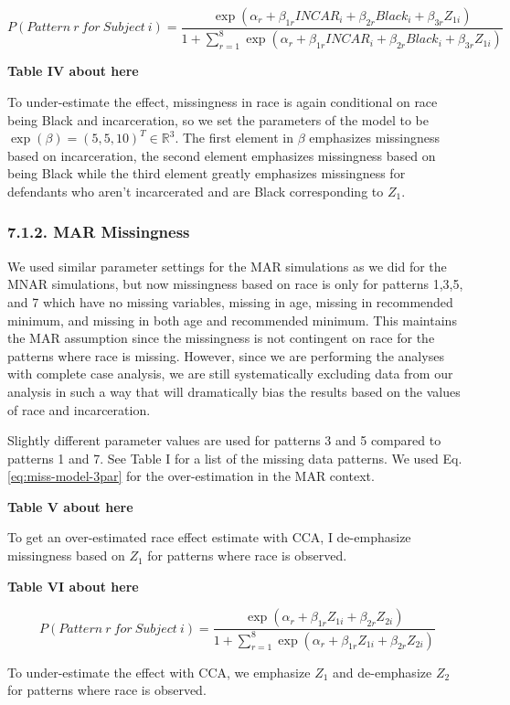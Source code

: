 \documentclass[titlepage]{article}
\begin{document}
\begin{equation}\label{eq:miss-model-3par}
    P(Pattern ~ r ~ for ~ Subject ~ i) = \frac{\exp\left(\alpha_r + \beta_{1r} INCAR_i + \beta_{2r} Black_i + \beta_{3r} Z_{1i}\right)}{1 + \sum_{r=1}^8 \exp\left(\alpha_r + \beta_{1r} INCAR_i + \beta_{2r} Black_i + \beta_{3r} Z_{1i}\right)}
\end{equation}

\begin{center}
    \textbf{Table IV about here}
\end{center}

To under-estimate the effect, missingness in race is again conditional on race being Black and incarceration, so we set the parameters of the model to be \(\exp(\beta) = (5,5,10)^T \in \mathbb{R}^3\). The first element in \(\beta\) emphasizes missingness based on incarceration, the second element emphasizes missingness based on being Black while the third element greatly emphasizes missingness for defendants who aren’t incarcerated and are Black corresponding to \(Z_1\).

\subsubsection*{7.1.2. MAR Missingness}

We used similar parameter settings for the MAR simulations as we did for the MNAR simulations, but now missingness based on race is only for patterns 1,3,5, and 7 which have no missing variables, missing in age, missing in recommended minimum, and missing in both age and recommended minimum. This maintains the MAR assumption since the missingness is not contingent on race for the patterns where race is missing. However, since we are performing the analyses with complete case analysis, we are still systematically excluding data from our analysis in such a way that will dramatically bias the results based on the values of race and incarceration.

Slightly different parameter values are used for patterns 3 and 5 compared to patterns 1 and 7. See Table I for a list of the missing data patterns. We used Eq. \ref{eq:miss-model-3par} for the over-estimation in the MAR context. 

\begin{center}
    \textbf{Table V about here}
\end{center}

To get an over-estimated race effect estimate with CCA, I de-emphasize missingness based on \(Z_1\) for patterns where race is observed.

\begin{center}
    \textbf{Table VI about here}
\end{center}

\begin{equation}\label{eq:miss-model-2par}
    P(Pattern ~ r ~ for ~ Subject ~ i) = \frac{\exp\left(\alpha_r + \beta_{1r} Z_{1i} + \beta_{2r} Z_{2i}\right)}{1 + \sum_{r=1}^8 \exp\left(\alpha_r + \beta_{1r} Z_{1i} + \beta_{2r} Z_{2i}\right)}
\end{equation}

To under-estimate the effect with CCA, we emphasize \(Z_1\) and de-emphasize \(Z_2\) for patterns where race is observed.
\end{document}
